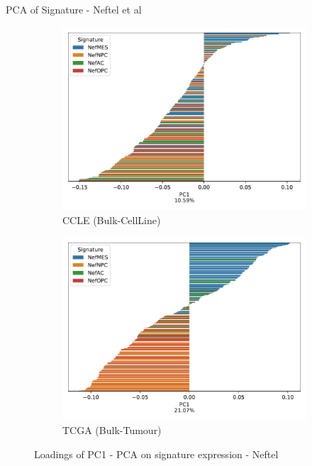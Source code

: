 \documentclass[aspectratio=169,9pt]{beamer}
\begin{document}
    \begin{frame}{PCA of Signature - Neftel et al}
        \begin{adjustwidth}{-5cm}{-5cm}
            \centering
            \begin{figure}
                \centering
                \begin{subfigure}[c]{0.48\textwidth}
                    \centering
                    \includegraphics[width=\textwidth]{CCLE_loadings_barplot_Nef}
                    \caption{CCLE (Bulk-CellLine)}
                \end{subfigure}
                \begin{subfigure}[c]{0.48\textwidth}
                    \centering
                    \includegraphics[width=\textwidth]{TCGA_loadings_barplot_Nef}
                    \caption{TCGA (Bulk-Tumour)}
                \end{subfigure}
                \caption{Loadings of PC1 - PCA on signature expression - Neftel}
            \end{figure}
        \end{adjustwidth}
    \end{frame}
\end{document}
